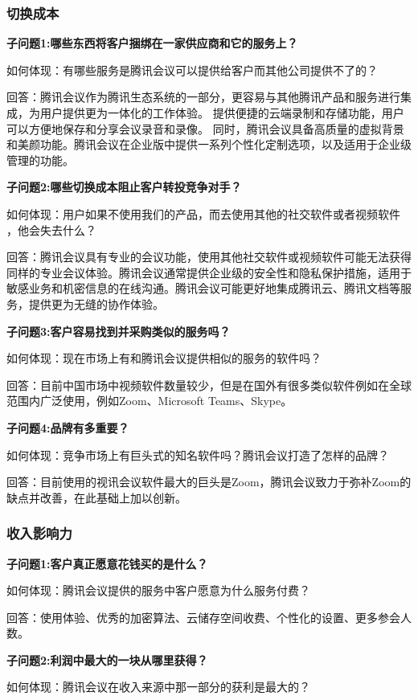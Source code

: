\documentclass[a4paper,12pt]{article}
\begin{document}
    \subsubsection{切换成本}
    \textbf{子问题1:哪些东西将客户捆绑在一家供应商和它的服务上？}

    如何体现：有哪些服务是腾讯会议可以提供给客户⽽其他公司提供不了的？

    回答：腾讯会议作为腾讯生态系统的一部分，更容易与其他腾讯产品和服务进行集成，为用户提供更为一体化的工作体验。
    提供便捷的云端录制和存储功能，用户可以方便地保存和分享会议录音和录像。
    同时，腾讯会议具备高质量的虚拟背景和美颜功能。腾讯会议在企业版中提供一系列个性化定制选项，以及适用于企业级管理的功能。

    \textbf{子问题2:哪些切换成本阻止客户转投竞争对手？}

    如何体现：⽤户如果不使⽤我们的产品，⽽去使⽤其他的社交软件或者视频软件 ，他会失去什么？

    回答：腾讯会议具有专业的会议功能，使用其他社交软件或视频软件可能无法获得同样的专业会议体验。腾讯会议通常提供企业级的安全性和隐私保护措施，适用于敏感业务和机密信息的在线沟通。腾讯会议可能更好地集成腾讯云、腾讯文档等服务，提供更为无缝的协作体验。


    \textbf{子问题3:客户容易找到并采购类似的服务吗？}

    如何体现：现在市场上有和腾讯会议提供相似的服务的软件吗？

    回答：目前中国市场中视频软件数量较少，但是在国外有很多类似软件例如在全球范围内广泛使用，例如Zoom、Microsoft Teams、Skype。

    \textbf{子问题4:品牌有多重要？}

    如何体现：竞争市场上有巨头式的知名软件吗？腾讯会议打造了怎样的品牌？

    回答：⽬前使⽤的视讯会议软件最⼤的巨头是Zoom，腾讯会议致⼒于弥补Zoom的缺点并改善，在此基础上加以创新。

    \subsubsection{收入影响力}
    \textbf{子问题1:客户真正愿意花钱买的是什么？}

    如何体现：腾讯会议提供的服务中客户愿意为什么服务付费？

    回答：使⽤体验、优秀的加密算法、云储存空间收费、个性化的设置、更多参会⼈数。
    
    \textbf{子问题2:利润中最大的一块从哪里获得？}

    如何体现：腾讯会议在收⼊来源中那⼀部分的获利是最⼤的？
\end{document}
